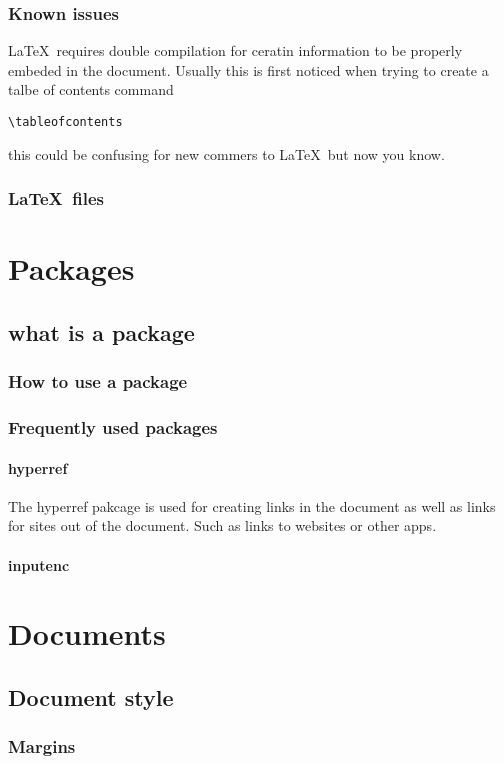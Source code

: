 \documentclass[12pt]{book}
\begin{document}
\subsection{Known issues}
\LaTeX \ requires double compilation for ceratin information to be properly embeded in the document.
Usually this is first noticed when trying to create a talbe of contents command
\begin{verbatim}
\tableofcontents
\end{verbatim}
this could be confusing for new commers to \LaTeX \ but now you know.
\newline
\subsection{\LaTeX \ files}
\chapter{Packages}
\section{what is a package}
\subsection{How to use a package}
\subsection{Frequently used packages}
\subsubsection{hyperref}
The hyperref pakcage is used for creating links in the document as well as links 
for sites out of the document. Such as links to websites or other apps.
\subsubsection{inputenc}
\chapter{Documents}
\section{Document style}
\subsection{Margins}
\end{document}
